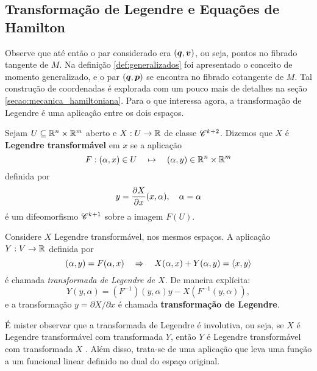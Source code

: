 \subsection{Transformação de Legendre e Equações de Hamilton}

Observe que até então o par considerado era $(\bm q, \bm v)$, ou seja, pontos no fibrado tangente de $M$. Na definição \ref{def:generalizados} foi apresentado o conceito de momento generalizado, e o par $(\bm q, \bm p)$ se encontra no fibrado cotangente de $M$. Tal construção de coordenadas é explorada com um pouco mais de detalhes na seção \ref{secao:mecanica_hamiltoniana}. Para o que interessa agora, a transformação de Legendre é uma aplicação entre os dois espaços.

\begin{definition}
    Sejam $U \subseteq \mathbb{R}^n \times \mathbb{R}^m$ aberto e $X:U \to \mathbb{R}$ de classe ${\mathscr{C}}^{k+2}$. Dizemos que $X$ é \textbf{Legendre transformável} em $x$ se a aplicação
    \begin{equation*}
        F:(\alpha, x) \in U \quad \mapsto \quad (\alpha, y) \in \mathbb{R}^n \times \mathbb{R}^m
    \end{equation*}
    definida por
    \begin{equation*}
        y = \dfrac{\partial X}{\partial x}(x, \alpha), \quad \alpha = \alpha
    \end{equation*}
    é um difeomorfismo ${\mathscr{C}}^{k+1}$ sobre a imagem $F(U)$.
\end{definition}

\begin{definition}
    Considere $X$ Legendre transformável, nos mesmos espaços. A aplicação $Y:V \to \mathbb{R}$ definida por
    \begin{equation*}
        (\alpha, y) = F(\alpha, x) \quad \Rightarrow \quad X(\alpha, x) + Y(\alpha, y) = \left\langle x, y \right\rangle
    \end{equation*}
    é chamada \textit{transformada de Legendre de $X$}.
    De maneira explícita:
    \begin{equation*}
        Y(y, \alpha) = (F^{-1})(y, \alpha) y - X(F^{-1}(y, \alpha)),
    \end{equation*}
    e a transformação $y = \partial X/\partial x$ é chamada \textbf{transformação de Legendre}.
\end{definition}

É mister observar que a transformada de Legendre é involutiva, ou seja, se $X$ é Legendre transformável com transformada $Y$, então $Y$ é Legendre transformável com transformada $X$ \citep[79]{de_queiroz_barros_mecanica_1995}. Além disso, trata-se de uma aplicação que leva uma função a um funcional linear definido no dual do espaço original.

